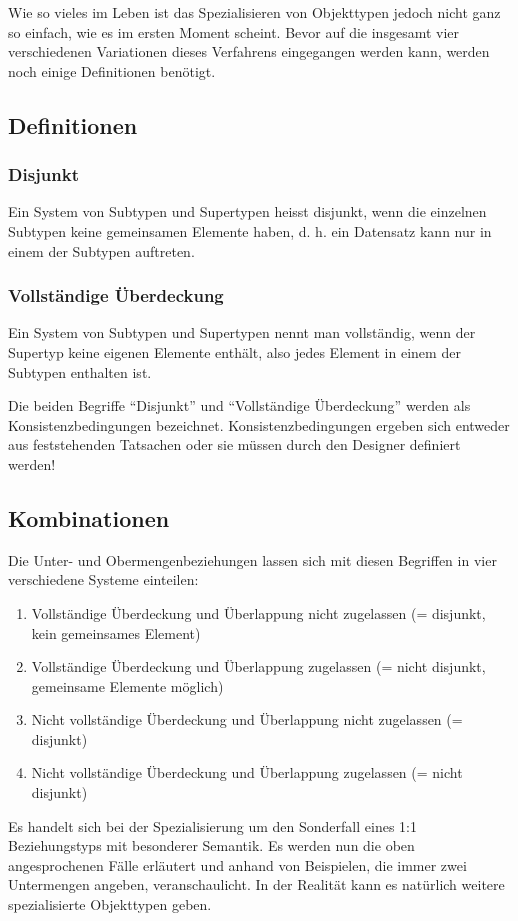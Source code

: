       Wie so vieles im Leben ist das Spezialisieren von Objekttypen jedoch
      nicht ganz so einfach, wie es im ersten Moment scheint. Bevor auf die
      insgesamt vier verschiedenen Variationen dieses Verfahrens eingegangen
      werden kann, werden noch einige Definitionen benötigt.
      \subsection{Definitionen}
        \subsubsection{Disjunkt}
          Ein System von Subtypen und Supertypen heisst disjunkt, wenn die
          einzelnen Subtypen keine gemeinsamen Elemente haben, d. h. ein
          Datensatz kann nur in einem der Subtypen auftreten.
        \subsubsection{Vollständige Überdeckung}
          Ein System von Subtypen und Supertypen nennt man vollständig, wenn
          der Supertyp keine eigenen Elemente enthält, also jedes Element in
          einem der Subtypen enthalten ist.

          \begin{merke}
            Die beiden Begriffe \enquote{Disjunkt} und \enquote{Vollständige
            Überdeckung} werden als Konsistenzbedingungen bezeichnet.
            Konsistenzbedingungen ergeben sich entweder aus feststehenden
            Tatsachen oder sie müssen durch den Designer definiert werden!
          \end{merke}

      \subsection{Kombinationen}
        Die Unter- und Obermengenbeziehungen lassen sich mit diesen Begriffen in
        vier verschiedene Systeme einteilen:
        \begin{enumerate}
          \item Vollständige Überdeckung und Überlappung nicht zugelassen (= disjunkt, kein gemeinsames Element)
          \item Vollständige Überdeckung und Überlappung zugelassen (= nicht disjunkt, gemeinsame Elemente möglich)
          \item Nicht vollständige Überdeckung und Überlappung nicht zugelassen (= disjunkt)
          \item Nicht vollständige Überdeckung und Überlappung zugelassen (= nicht disjunkt)
        \end{enumerate}
        Es handelt sich bei der Spezialisierung um den Sonderfall eines 1:1
        Beziehungstyps mit besonderer Semantik. Es werden nun die oben
        angesprochenen Fälle erläutert und anhand von Beispielen, die immer
        zwei Untermengen angeben, veranschaulicht. In der Realität kann es
        natürlich weitere spezialisierte Objekttypen geben.
